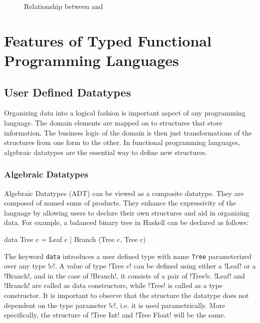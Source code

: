 \documentclass[manuscript,screen,nonacm]{acmart}
\begin{document}
\begin{figure}[ht]
  \centering
  \caption{Relationship between \SF and \SOPL}
  \label{fig:sf-p2-relation}
\end{figure}


\section{Features of Typed Functional Programming Languages}\label{sec:language-features}
\subsection{User Defined Datatypes}
Organizing data into a logical fashion is important aspect of any programming language. The domain elements are mapped on to structures that store information. The business logic of the domain is then just transformations of the structures from one form to the other. In functional programming languages, algebraic datatypes are the essential way to define new structures.

\subsubsection{Algebraic Datatypes}
Algebraic Datatypes (ADT) can be viewed as a composite datatype. They are composed of named sums of products. They enhance the expressivity of the language by allowing users to declare their own structures and aid in organizing data. For example, a balanced binary tree in Haskell can be declared as follows:

\begin{code}
  data Tree c = Leaf c | Branch (Tree c, Tree c)
\end{code}

The keyword \lstinline{data} introduces a user defined type with name \lstinline{Tree} parameterized over any type !c!. A value of type !Tree c! can be defined using either a !Leaf! or a !Branch!, and in the case of !Branch!, it consists of a pair of !Tree!s. !Leaf! and !Branch! are called as data constructors, while !Tree! is called as a type constructor. It is important to observe that the structure the datatype does not dependent on the type parameter !c!, i.e. it is used parametrically. More specifically, the structure of !Tree Int! and !Tree Float! will be the same.
\end{document}
